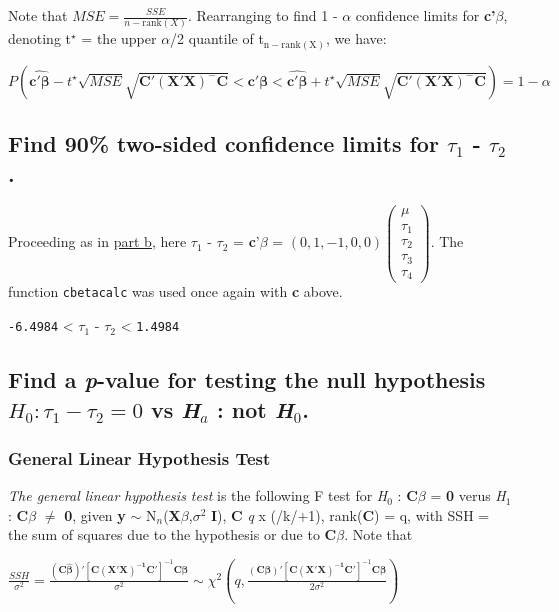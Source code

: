 \documentclass[11pt]{article}
\begin{document}
Note that $MSE = \frac{SSE}{n-\mathrm{rank}(X)}$. Rearranging to find 1 - $\alpha$ confidence limits for \textbf{c'$\beta$},
denoting t$^{\star}$ = the upper $\alpha$/2 quantile of t$_{\mathrm{n-rank(X)}}$, we
have:

$$P\left( \widehat{\mathbf{c'\beta}} -
t^{\star}\sqrt{MSE}\sqrt{\mathbf{C'(X'X)^{-}C}} < \mathbf{c'\beta} <  \widehat{\mathbf{c'\beta}} +
t^{\star}\sqrt{MSE}\sqrt{\mathbf{C'(X'X)^{-}C}} \right) = 1 - \alpha$$
\subsection{Find 90\% two-sided confidence limits for $\tau$$_1$ - $\tau$$_2$.}
\label{sec-1-3}
\label{Tau1Tau2}

Proceeding as in \hyperref[MuTau2]{part b}, here $\tau$$_1$ - $\tau$$_2$ = \textbf{c}'\textbf{$\beta$} = $(0, 1, -1,
0, 0) \begin{pmatrix} \mu \\ \tau_1 \\ \tau_2
\\ \tau_3 \\ \tau_4 \end{pmatrix}$. The function \verb~cbetacalc~ was used
once again with \textbf{c} above. 

\texttt{-6.4984} 
< $\tau$$_1$ - $\tau$$_2$ <
\texttt{1.4984}
\subsection{Find a \emph{p}-value for testing the null hypothesis $H_0 : \tau_1 - \tau_2 = 0$ vs \emph{H$_a$} : not \emph{H$_0$}.}
\label{sec-1-4}
\subsubsection{General Linear Hypothesis Test}
\label{sec-1-4-1}

\emph{The general linear hypothesis test} is the following F test for
\emph{H$_0$} : \textbf{C$\beta$} = \textbf{0} verus \emph{H$_1$} : \textbf{C$\beta$} $\neq$ \textbf{0}, given \textbf{y}
$\sim$ N$_n$(\textbf{X$\beta$},$\sigma$$^2$ \textbf{I}), \textbf{C} \emph{q} x (/k/+1), rank(\textbf{C}) = q, with SSH = the sum of squares due to
the hypothesis or due to \textbf{C$\beta$}. Note that 

\(\frac{SSH}{\sigma^2} = \frac{(\mathbf{C\hat{\beta}})'[\mathbf{C(X'X)^{-1}C}']^{-1}\mathbf{C\hat{\beta}}}{\sigma^2}
\sim
\chi^2(q,\frac{(\mathbf{C\beta})'[\mathbf{C(X'X)^{-1}C}']^{-1}\mathbf{C\beta}}{2\sigma^2})\)
\end{document}
